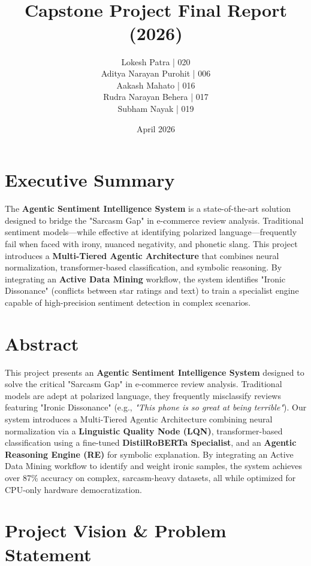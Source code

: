 \documentclass[11pt,oneside]{scrbook}
\title{
    \vspace{2cm}
    \Huge \textbf{\projecttitle}\\
    \Large \textit{\mysubtitle}\\
    \vspace{1.5cm}
    \Large Capstone Project Final Report (2026)
}
\author{
    Lokesh Patra | 020 \\
    Aditya Narayan Purohit | 006 \\
    Aakash Mahato | 016 \\
    Rudra Narayan Behera | 017 \\
    Subham Nayak | 019
}
\date{April 2026}
\begin{document}
\frontmatter
\maketitle

\chapter{Executive Summary}
The \textbf{Agentic Sentiment Intelligence System} is a state-of-the-art solution designed to bridge the "Sarcasm Gap" in e-commerce review analysis. Traditional sentiment models---while effective at identifying polarized language---frequently fail when faced with irony, nuanced negativity, and phonetic slang. This project introduces a \textbf{Multi-Tiered Agentic Architecture} that combines neural normalization, transformer-based classification, and symbolic reasoning. By integrating an \textbf{Active Data Mining} workflow, the system identifies "Ironic Dissonance" (conflicts between star ratings and text) to train a specialist engine capable of high-precision sentiment detection in complex scenarios.

\chapter{Abstract}
This project presents an \textbf{Agentic Sentiment Intelligence System} designed to solve the critical "Sarcasm Gap" in e-commerce review analysis. Traditional models are adept at polarized language, they frequently misclassify reviews featuring "Ironic Dissonance" (e.g., \textit{"This phone is so great at being terrible"}). Our system introduces a Multi-Tiered Agentic Architecture combining neural normalization via a \textbf{Linguistic Quality Node (LQN)}, transformer-based classification using a fine-tuned \textbf{DistilRoBERTa Specialist}, and an \textbf{Agentic Reasoning Engine (RE)} for symbolic explanation. By integrating an Active Data Mining workflow to identify and weight ironic samples, the system achieves over 87\% accuracy on complex, sarcasm-heavy datasets, all while optimized for CPU-only hardware democratization.

\tableofcontents
\listoftables
\listoffigures

\mainmatter

\chapter{Project Vision \& Problem Statement}
\end{document}
